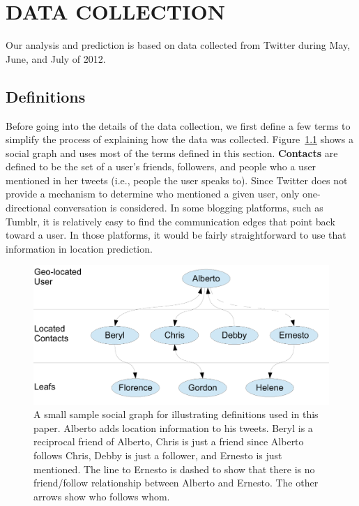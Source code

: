 \chapter{\uppercase {Data Collection}}

Our analysis and prediction is based on data collected from Twitter during May,
June, and July of 2012.

\section{Definitions}
Before going into the details of the data collection, we first define a few
terms to simplify the process of explaining how the data was collected.
%
Figure~\ref{fig:Terms} shows a social graph and uses most of the terms defined
in this section.
%
\textbf{Contacts} are defined to be the set of a user's friends, followers, and
people who a user mentioned in her tweets (i.e., people the user speaks to).
%
Since Twitter does not provide a mechanism to determine who mentioned a given
user, only one-directional conversation is considered.
%
In some blogging platforms, such as Tumblr, it is relatively easy to find the
communication edges that point back toward a user.
%
In those platforms, it would be fairly straightforward to use that information
in location prediction.

\begin{figure}[tb]
\centering
\includegraphics[width=\linewidth]{figures/terms.pdf}
\caption{
A small sample social graph for illustrating definitions used in this paper.
Alberto adds location information to his tweets.
Beryl is a reciprocal friend of Alberto, Chris is just a friend since Alberto
follows Chris, Debby is just a follower, and Ernesto is just mentioned.
The line to Ernesto is dashed to show that there is no friend/follow
relationship between Alberto and Ernesto.
The other arrows show who follows whom.
}
\label{fig:Terms}
\end{figure}

